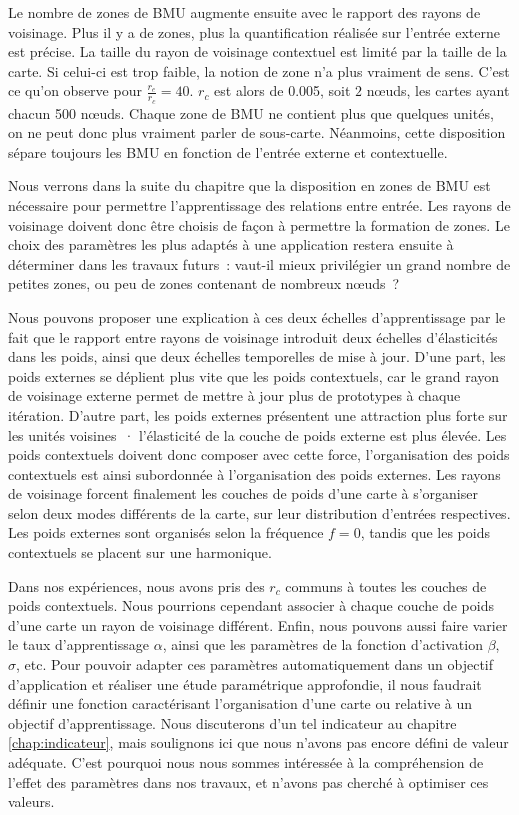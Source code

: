\documentclass[../main]{subfiles}
\begin{document}
Le nombre de zones de BMU augmente ensuite avec le rapport des rayons de voisinage. Plus il y a de zones, plus la quantification réalisée sur l'entrée externe est précise.
La taille du rayon de voisinage contextuel est  limité par la taille de la carte. Si celui-ci est trop faible, la notion de zone n'a plus vraiment de sens. C'est ce qu'on observe pour $\frac{r_e}{r_c} = 40$. $r_c$ est alors de 0.005, soit $2$ n\oe{}uds, les cartes ayant chacun 500 n\oe{}uds. 
Chaque zone de BMU ne contient plus que quelques unités, on ne peut donc plus vraiment parler de sous-carte. Néanmoins, cette disposition sépare toujours les BMU en fonction de l'entrée externe et contextuelle.

Nous verrons dans la suite du chapitre que la disposition en zones de BMU est nécessaire pour permettre l'apprentissage des relations entre entrée. Les rayons de voisinage doivent donc être choisis de façon à permettre la formation de zones. Le choix des paramètres les plus adaptés à une application restera ensuite à déterminer dans les travaux futurs~: vaut-il mieux privilégier un grand nombre de petites zones, ou peu de zones contenant de nombreux n\oe{}uds~?

Nous pouvons proposer une explication à ces deux échelles d'apprentissage par le fait que le rapport entre rayons de voisinage introduit deux échelles d'élasticités dans les poids, ainsi que deux échelles temporelles de mise à jour.
D'une part, les poids externes se déplient plus vite que les poids contextuels, car le grand rayon de voisinage externe permet de mettre à jour plus de prototypes à chaque itération.
D'autre part, les poids externes présentent une \og attraction \fg{} plus forte sur les unités voisines~· l'élasticité de la couche de poids externe est plus élevée.
Les poids contextuels doivent donc composer avec cette force, l'organisation des poids contextuels est ainsi subordonnée à l'organisation des poids externes. 
Les rayons de voisinage forcent finalement les couches de poids d'une carte à s'organiser selon deux modes différents de la carte, sur leur distribution d'entrées respectives. Les poids externes sont organisés selon la fréquence $f=0$, tandis que les poids contextuels se placent sur une harmonique.


Dans nos expériences, nous avons pris des $r_c$ communs à toutes les couches de poids contextuels.
Nous pourrions cependant associer à chaque couche de poids d'une carte un rayon de voisinage différent. 
Enfin, nous pouvons aussi faire varier le taux d'apprentissage $\alpha$, ainsi que les paramètres de la fonction d'activation $\beta$, $\sigma$, etc.
Pour pouvoir adapter ces paramètres automatiquement dans un objectif d'application et réaliser une étude paramétrique approfondie, il nous faudrait définir une fonction caractérisant l'organisation d'une carte ou relative à un objectif d'apprentissage. 
Nous discuterons d'un tel indicateur au chapitre \ref{chap:indicateur}, mais soulignons ici que nous n'avons pas encore défini de valeur adéquate. C'est pourquoi nous nous sommes intéressée à la compréhension de l'effet des paramètres dans nos travaux, et n'avons pas cherché à optimiser ces valeurs.
\end{document}
